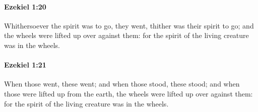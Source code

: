 		\paragraph{Ezekiel 1:20} %
			\label{EZEKIEL-1-20}

			Whithersoever the spirit was to go, they went, thither was their spirit to go; and the wheels were lifted up over against them: for the spirit of the living creature was in the wheels.


		\paragraph{Ezekiel 1:21} %
			\label{EZEKIEL-1-21}

			When those went, these went; and when those stood, these stood; and when those were lifted up from the earth, the wheels were lifted up over against them: for the spirit of the living creature was in the wheels.

